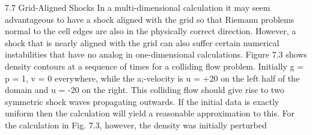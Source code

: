 7.7 Grid-Aligned Shocks
In a multi-dimensional calculation it may seem advantageous to have a shock
aligned with the grid so that Riemann problems normal to the cell edges
are also in the physically correct direction. However, a shock that is nearly
aligned with the grid can also suffer certain numerical instabilities that have
no analog in one-dimensional calculations. Figure 7.3 shows density contours
at a sequence of times for a colliding flow problem. Initially g = p = 1,
v = 0 everywhere, while the a;-velocity is u = +20 on the left half of the
domain and u = -20 on the right. This colliding flow should give rise to two
symmetric shock waves propagating outwards. If the initial data is exactly
uniform then the calculation will yield a reasonable approximation to this.
For the calculation in Fig. 7.3, however, the density was initially perturbed

